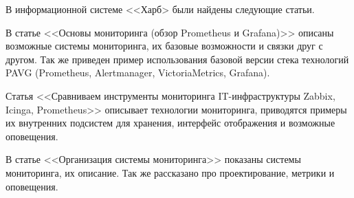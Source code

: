 В информационной системе <<Харб> были найдены следующие статьи.

В статье <<Основы мониторинга (обзор Prometheus и Grafana)>> \cite{habr-709204}
описаны возможные системы мониторинга, их базовые возможности и связки друг с другом.
Так же приведен пример использования базовой версии стека технологий PAVG (Prometheus, Alertmanager, VictoriaMetrics, Grafana).

Статья <<Сравниваем инструменты мониторинга IT-инфраструктуры Zabbix, Icinga, Prometheus>> \cite{habr-705464}
описывает технологии мониторинга, приводятся примеры их внутренних подсистем для хранения, интерфейс отображения
и возможные оповещения.

В статье <<Организация системы мониторинга>> \cite{habr-350200} показаны системы мониторинга, их 
описание. Так же рассказано про проектирование, метрики и оповещения. 